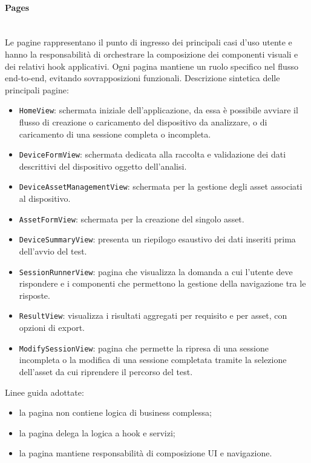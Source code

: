\documentclass[a4paper,12pt]{article}
\begin{document}
            \paragraph{Pages}\mbox{}\\
                Le pagine rappresentano il punto di ingresso dei principali casi d'uso utente e hanno la responsabilità di orchestrare la composizione dei componenti visuali e dei relativi hook applicativi.
                Ogni pagina mantiene un ruolo specifico nel flusso end-to-end, evitando sovrapposizioni funzionali.
                Descrizione sintetica delle principali pagine:
                \begin{itemize}
                    \item \texttt{HomeView}: schermata iniziale dell'applicazione, da essa è possibile avviare il flusso di creazione o caricamento del dispositivo da analizzare, o di caricamento di una sessione completa o incompleta.
                    \item \texttt{DeviceFormView}: schermata dedicata alla raccolta e validazione dei dati descrittivi del dispositivo oggetto dell'analisi.
                    \item \texttt{DeviceAssetManagementView}: schermata per la gestione degli asset associati al dispositivo.
                    \item \texttt{AssetFormView}: schermata per la creazione del singolo asset.
                    \item \texttt{DeviceSummaryView}: presenta un riepilogo esaustivo dei dati inseriti prima dell'avvio del test.
                    \item \texttt{SessionRunnerView}: pagina che visualizza la domanda a cui l'utente deve rispondere e i componenti che permettono la gestione della navigazione tra le risposte.
                    \item \texttt{ResultView}: visualizza i risultati aggregati per requisito e per asset, con opzioni di export.
                    \item \texttt{ModifySessionView}: pagina che permette la ripresa di una sessione incompleta o la modifica di una sessione completata tramite la selezione dell'asset da cui riprendere il percorso del test.
                \end{itemize}
                Linee guida adottate:
                \begin{itemize}
                    \item la pagina non contiene logica di business complessa;
                    \item la pagina delega la logica a hook e servizi;
                    \item la pagina mantiene responsabilità di composizione UI e navigazione.
                \end{itemize}
\end{document}
